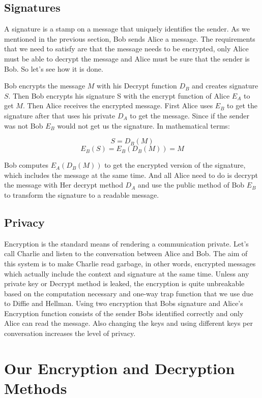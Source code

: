 \documentclass[12pt, letterpaper]{article}
\begin{document}
\subsection{Signatures}

A signature is a stamp on a message that uniquely identifies the sender. As we mentioned in the previous section, Bob sends Alice a message. The requirements that we need to satisfy are that the message needs to be encrypted, only Alice must be able to decrypt the message and Alice must be sure that the sender is Bob. So let's see how it is done.\par
Bob encrypts the message $M$ with his Decrypt function $D_B$ and creates signature $S$. Then Bob encrypts his signature S with the encrypt function of Alice $E_A$ to get $M$. Then Alice receives the encrypted message. First Alice uses $E_B$ to get the signature after that uses his private $D_A$ to get the message. Since if the sender was not Bob $E_B$ would not get us the signature. In mathematical terms:

\[ S = D_B(M) \] 
\[ E_B(S) = E_B(D_B(M)) = M \] 

Bob computes $E_A(D_B(M))$ to get the encrypted version of the signature, which includes the message at the same time. And all Alice need to do is decrypt the message with Her decrypt method $D_A$ and use the public method of Bob $E_B$ to transform the signature to a readable message.

\subsection{Privacy}

Encryption is the standard means of rendering a communication private. Let's call Charlie and listen to the conversation between Alice and Bob. The aim of this system is to make Charlie read garbage, in other words, encrypted messages which actually include the context and signature at the same time. Unless any private key or Decrypt method is leaked, the encryption is quite unbreakable based on the computation necessary and one-way trap function that we use due to Diffie and Hellman. Using two encryption that Bobs signature and Alice's Encryption function consists of the sender Bobs identified correctly and only Alice can read the message. Also changing the keys and using different keys per conversation increases the level of privacy.\par

\section{Our Encryption and Decryption Methods}
\end{document}
